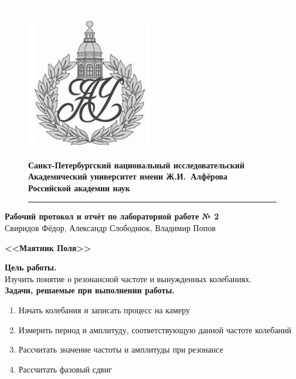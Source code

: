 \documentclass[a4paper]{article}
\begin{document}
	\begin{figure}[htb]
		\begin{minipage}[c]{0.12\textwidth}
			\includegraphics[scale=0.25]{AU}
		\end{minipage}
		\hfill
		\begin{minipage}[t]{0.9\textwidth}
			{\Large\bfseries Санкт-Петербургский национальный исследовательский Академический университет имени Ж.И.~Алфёрова\\Российской академии наук}
		\end{minipage}
		\rule{164mm}{0.3mm}
	\end{figure}
	
	\begin{center}
		{\large\textbf{Рабочий протокол и отчёт по лабораторной работе № 2}}\\
		Свиридов Фёдор, Александр Слободнюк, Владимир Попов
	\end{center}
	\begin{center}
		\Large\bfseries{<<Маятник Поля>>}\\
	\end{center}
	{\parindent=0pt\textbf{Цель работы.}}\\
	Изучить понятие о резонансной частоте и вынужденных колебаниях.\\
	
	{\parindent=0pt\textbf{Задачи, решаемые при выполнении работы.}}
	\begin{enumerate}
		\item Начать колебания и записать процесс на камеру
		\item Измерить период и амплитуду, соответствующую данной частоте колебаний
		\item Рассчитать значение частоты и амплитуды при резонансе
		\item Рассчитать фазовый сдвиг
	\end{enumerate}
\end{document}
